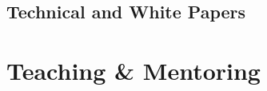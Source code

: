 \documentclass[11pt,letterpaper,sans,unicode]{moderncv}
\begin{document}
\subsection{Technical and White Papers}

\begin{etaremune}[leftmargin=8mm]

\end{etaremune}

\section{Teaching \& Mentoring}

\end{document}
